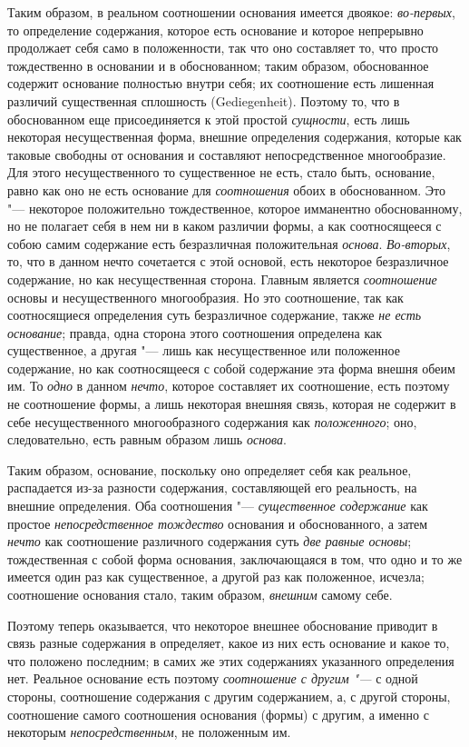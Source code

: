 Таким образом, в реальном соотношении основания имеется двоякое:
{\em во-первых}, то определение содержания, которое
есть основание и которое непрерывно продолжает себя само в положенности,
так что оно составляет то, что просто тождественно в основании и в
обоснованном; таким образом, обоснованное содержит основание полностью
внутри себя; их соотношение есть лишенная различий существенная сплошность
(Gediegenheit). Поэтому то, что в обоснованном еще присоединяется к этой
простой {\em сущности}, есть лишь некоторая
несущественная форма, внешние определения содержания, которые как таковые
свободны от основания и составляют непосредственное многообразие. Для этого
несущественного то существенное не есть, стало быть, основание, равно как
оно не есть основание для {\em соотношения} обоих в
обоснованном. Это "--- некоторое положительно тождественное, которое
имманентно обоснованному, но не полагает себя в нем ни в каком различии
формы, а как соотносящееся с собою самим содержание есть безразличная
положительная {\em основа}.
{\em Во-вторых}, то, что в данном нечто сочетается с
этой основой, есть некоторое безразличное содержание, но как несущественная
сторона. Главным является {\em соотношение} основы и
несущественного многообразия. Но это соотношение, так как соотносящиеся
определения суть безразличное содержание, также {\em не
есть основание}; правда, одна сторона этого соотношения определена как
существенное, а другая "--- лишь как несущественное или положенное содержание,
но как соотносящееся с собой содержание эта форма внешня обеим им. То
{\em одно} в данном {\em нечто},
которое составляет их соотношение, есть поэтому не соотношение формы, а
лишь некоторая внешняя связь, которая не содержит в себе несущественного
многообразного содержания как {\em положенного}; оно,
следовательно, есть равным образом лишь {\em основа}.

Таким образом, основание, поскольку оно определяет себя как реальное,
распадается из-за разности содержания, составляющей его реальность, на
внешние определения. Оба соотношения
"--- {\em существенное содержание} как простое
{\em непосредственное тождество} основания и
обоснованного, а затем {\em нечто} как соотношение
различного содержания суть {\em две равные основы};
тождественная с собой форма основания, заключающаяся в том, что одно и то
же имеется один раз как существенное, а другой раз как положенное, исчезла;
соотношение основания стало, таким образом,
{\em внешним} самому себе.

Поэтому теперь оказывается, что некоторое внешнее обоснование приводит в
связь разные содержания в определяет, какое из них есть основание и какое
то, что положено последним; в самих же этих содержаниях указанного
определения нет. Реальное основание есть поэтому
{\em соотношение с другим "--- }с одной стороны,
соотношение содержания с другим содержанием, а, с другой стороны,
соотношение самого соотношения основания (формы) с другим, а именно с
некоторым {\em непосредственным}, не положенным им.


